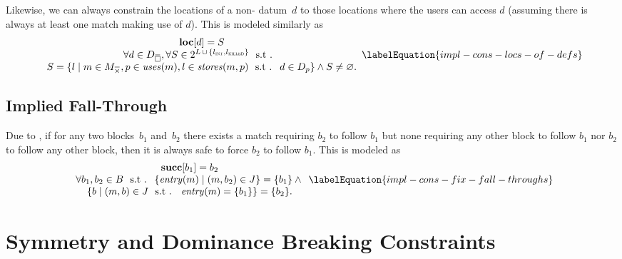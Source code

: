 Likewise, we can always constrain the \glspl{location} of a non- \gls{datum}~$d$ to those \glspl{location} where the users can access $d$
(assuming there is always at least one \gls{match} making use of $d$).
%
This is modeled similarly as
%
\begin{equation}
  \begin{array}{c}
    \mVar{loc}[d] = S \\
    \forall d \in \mStateDataCompSet,
    \forall S \in
      \mPowerset{\mLocationSet
      \, \cup \,
      \mSet{\mIntLocation, \mKilledLocation}} \text{ \st} \\
    S = \mSetBuilder{l}%
                    {%
                      m \in \mKillMatchCompSet,
                      p \in \mUses(m),
                      l \in \mStores(m, p)
                      \text{ \st }
                      d \in \mDataSet[p]
                    }
    \mAnd
    S \neq \mEmptySet.
  \end{array}
  \labelEquation{impl-cons-locs-of-defs}
\end{equation}


\subsection{Implied Fall-Through}

Due to , if for any two \glspl{block}~$b_1$ and~$b_2$
there exists a \gls{match} requiring $b_2$ to follow $b_1$ but none requiring
any other \gls{block} to follow $b_1$ nor $b_2$ to follow any other \gls{block},
then it is always safe to force $b_2$ to follow $b_1$.
%
This is modeled as
%
\begin{equation}
  \begin{array}{c}
    \mVar{succ}[b_1] = b_2 \\
    \forall b_1, b_2 \in \mBlockSet
    \text{ \st }
    \mSetBuilder{\mEntry(m)}{\mPair{m}{b_2} \in \mFallThroughSet} = \mSet{b_1}
    \mAnd \mbox{} \\
    \mSetBuilder{b}%
                {%
                  \mPair{m}{b} \in \mFallThroughSet
                  \text{ \st }
                  \mEntry(m) = \mSet{b_1}%
                } = \mSet{b_2}.
  \end{array}
  \labelEquation{impl-cons-fix-fall-throughs}
\end{equation}


\section{Symmetry and Dominance Breaking Constraints}

